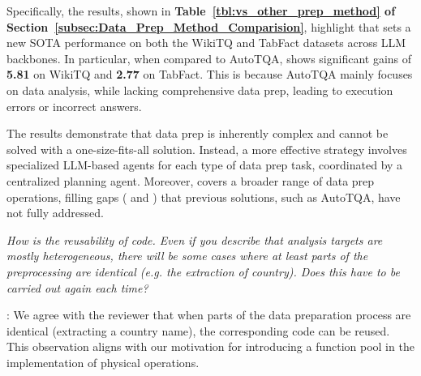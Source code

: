 Specifically, the results, shown in \textbf{Table~\ref{tbl:vs_other_prep_method} of Section~\ref{subsec:Data_Prep_Method_Comparision}}, highlight that \sys sets a new SOTA performance on both the WikiTQ and TabFact datasets across LLM backbones. In particular, when compared to AutoTQA, \sys shows significant gains of \textbf{5.81} on WikiTQ and \textbf{2.77} on TabFact. This is because AutoTQA mainly focuses on data analysis, while lacking comprehensive data prep, leading to execution errors or incorrect answers.

The results demonstrate that data prep is inherently complex and cannot be solved with a one-size-fits-all solution. Instead, a more effective strategy involves specialized LLM-based agents for each type of data prep task, coordinated by a centralized planning agent. Moreover, \sys covers a broader range of data prep operations, filling gaps (\eg {} and ) that previous solutions, such as AutoTQA, have not fully addressed.




\begin{shaded}
{
\emph{How is the reusability of code. Even if you describe that analysis targets are mostly heterogeneous, there will be some cases where at least parts of the preprocessing are identical (e.g. the extraction of country). Does this have to be carried out again each time?
}
}
\end{shaded}

:
We agree with the reviewer that when parts of the data preparation process are identical (\eg extracting a country name), the corresponding code can be reused. This observation aligns with our motivation for introducing a function pool in the implementation of physical operations. 

